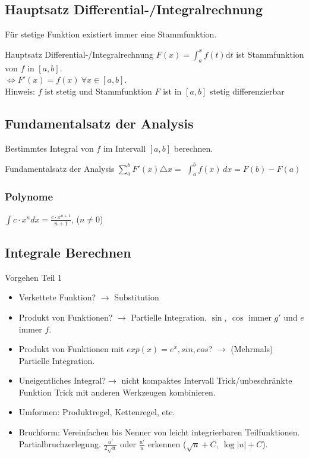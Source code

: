 \documentclass[a4paper]{article}
\begin{document}
\subsection{Hauptsatz Differential-/Integralrechnung}
Für stetige Funktion existiert immer eine Stammfunktion. \\
\begin{mainbox}{Hauptsatz Differential-/Integralrechnung}
  $F(x) = \int_{a}^{x} f(t) \mathrm{d}t$ ist Stammfunktion von $f$ in $[a,b]$. \\
  $\iff F'(x) = f(x) \ \forall x \in [a,b]$.\\
  \tiny \color{gray}
    Hinweis: $f$ ist stetig und Stammfunktion $F$ ist in $[a, b]$ stetig differenzierbar
  \normalsize \color{black}
\end{mainbox}

\subsection{Fundamentalsatz der Analysis}
Bestimmtes Integral von $f$ im Intervall $[a, b]$ berechnen. 
\begin{mainbox}{Fundamentalsatz der Analysis}
  \tiny \color{gray}
    $\sum_{a}^{b}F'(x) \triangle x = $
  \normalsize \color{black}
  $ \int_{a}^{b} f(x) \,dx = F(b) - F(a)$
\end{mainbox}
\subsubsection*{Polynome}
$\int c \cdot x^ndx = \frac{c \cdot x^{n+1}}{n+1}$, ($n \neq 0$)

\subsection{Integrale Berechnen}
\begin{howtobox}{Vorgehen Teil 1}
  \begin{itemize}[leftmargin=4.5mm, topsep=1pt, parsep=1pt]
    \item[1.] Verkettete Funktion? $\to$ Substitution
    \item[2.] Produkt von Funktionen? $\to$ Partielle Integration. $\sin, \ \cos$ immer $g'$ und $e$ immer $f$.
    \item[3.] Produkt von Funktionen mit $exp(x) = e^x, sin, cos$? $\to$ (Mehrmals) Partielle Integration. 
    \item[4.] Uneigentliches Integral?$\to$ nicht kompaktes Intervall Trick/unbeschränkte Funktion Trick mit anderen Werkzeugen kombinieren.
    \item[5.] Umformen: Produktregel, Kettenregel, etc.
    \item[6.] Bruchform: Vereinfachen bis Nenner von leicht integrierbaren Teilfunktionen. Partialbruchzerlegung. $\frac{u'}{2 \sqrt{u}}$ oder $\frac{u'}{u}$ erkennen ($\sqrt{u} + C, \ \log|u| + C$).
  \end{itemize}
\end{howtobox}
\end{document}

